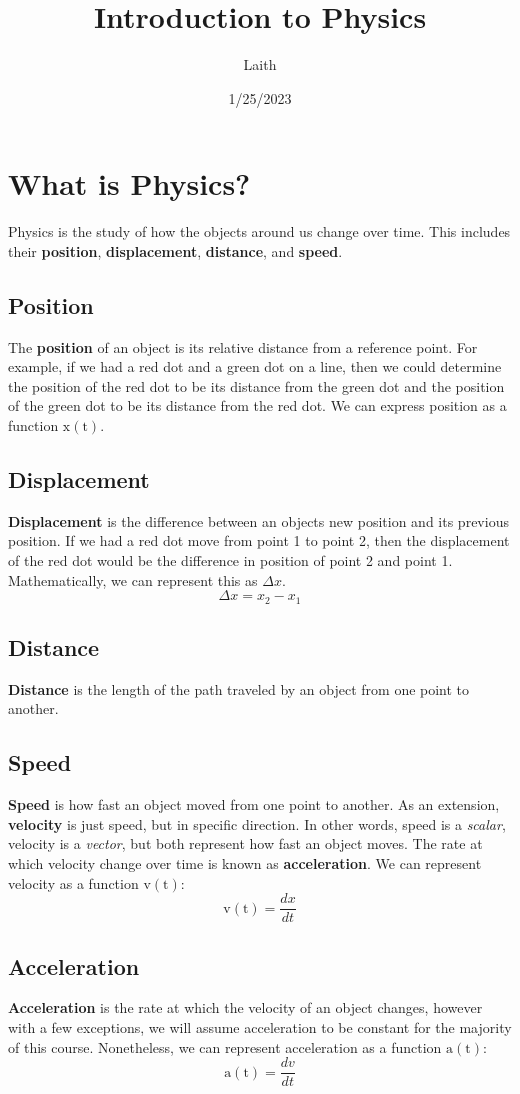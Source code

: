 \documentclass{article}
\author{Laith}
\title{Introduction to Physics}
\date{1/25/2023}
\newcommand{\diff}[1]{\frac{#1}{dt}}
\begin{document}
	\maketitle
	\section{What is Physics?}
	Physics is the study of how the objects around us change over time. 
	This includes their \textbf{position}, \textbf{displacement}, \textbf{distance}, and \textbf{speed}.
	\subsection{Position}
	The \textbf{position} of an object is its relative distance from a reference point. For example, if we had a red dot and a green dot on a line, then we could
	determine the position of the red dot to be its distance from the green dot and the position of the green dot to be its distance from the red dot.
	We can express position as a function $\mathrm{x(t)}$.
	\subsection{Displacement}
	\textbf{Displacement} is the difference between an objects new position and its previous position. If we had a red dot move from point 1 to point 2, then the
	displacement of the red dot would be the difference in position of point 2 and point 1.
	Mathematically, we can represent this as $\Delta{x}$.
	\[\Delta{x} = x_2-x_1\]
	\subsection{Distance}
	\textbf{Distance} is the length of the path traveled by an object from one point to another.
	\subsection{Speed}
	\textbf{Speed} is how fast an object moved from one point to another. As an extension, \textbf{velocity} is just speed, but in specific direction. In other words,
	speed is a \emph{scalar}, velocity is a \emph{vector}, but both represent how fast an object moves. The rate at which velocity change over time is known as \textbf{acceleration}.
	We can represent velocity as a function $\mathrm{v(t)}$:
	\[\mathrm{v(t)} = \diff{dx}\]
	\subsection{Acceleration}
	\textbf{Acceleration} is the rate at which the velocity of an object changes, however with a few exceptions,
	we will assume acceleration to be constant for the majority of this course. Nonetheless, we can represent
	acceleration as a function $\mathrm{a(t)}$:
	\[\mathrm{a(t)} = \diff{dv}\]	
\end{document}
